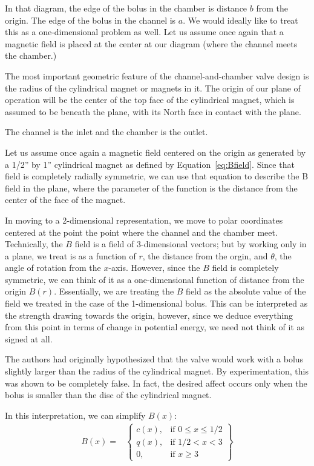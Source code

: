 \documentclass{asme2ej}
\begin{document}
In that diagram, the edge of the bolus in the chamber is distance $b$ from the
origin. The edge of the bolus in the channel is $a$.
We would ideally like to treat this as a one-dimensional problem as well.
Let us assume once again that a magnetic field is placed at the center
at our diagram (where the channel meets the chamber.)

The most important geometric feature of the channel-and-chamber
valve design is the radius of the cylindrical magnet or magnets
in it. The origin of our plane of operation
will be the center of the top face of the cylindrical magnet,
which is assumed to be beneath the plane, with its North face
in contact with the plane.

The channel is the inlet and the chamber is the
outlet.

Let us assume once again a magnetic field centered on the origin as generated by a
1/2'' by 1'' cylindrical magnet as defined by Equation~\ref{eq:Bfield}.
Since that field is completely radially symmetric, we can use that equation to
describe the B field in the plane, where the parameter of the function
is the distance from the center of the face of the magnet.

In moving to a 2-dimensional representation, we move to polar coordinates
centered at the point the point where the channel and the chamber meet.
Technically, the $B$ field is a field of 3-dimensional vectors; but
by working only in a plane, we treat is as a function of $r$, the distance
from the orgin, and $\theta$, the angle of rotation from the $x$-axis. However,
since the $B$ field is completely symmetric, we can think of it as a one-dimensional
function of distance from the origin $B(r)$. Essentially, we are treating the
$B$ field as the absolute value of the field we treated in the case of the 1-dimensional
bolus.
This can be interpreted as the strength drawing towards the origin, however, since
we deduce everything from this point in terms of change in potential energy,
we need not think of it as signed at all.

The authors had originally hypothesized that the valve would work with a bolus
slightly larger than the radius of the cylindrical magnet.
By experimentation, this was shown to be completely false.
In fact, the desired affect occurs only when the bolus is smaller than the
disc of the cylindrical magnet.

In this interpretation, we can simplify $B(x)$:
\begin{align}
B(x) = &
\left\{
    \begin{array}{lr}
      c(x) , & \text{if } 0 \leq x \leq 1/2 \\
      q(x) , & \text{if } 1/2 < x < 3 \\
      0 , & \text{if } x \geq 3
    \end{array}
    \right\}
    \label{eq:Bfield}
\end{align}
\end{document}
